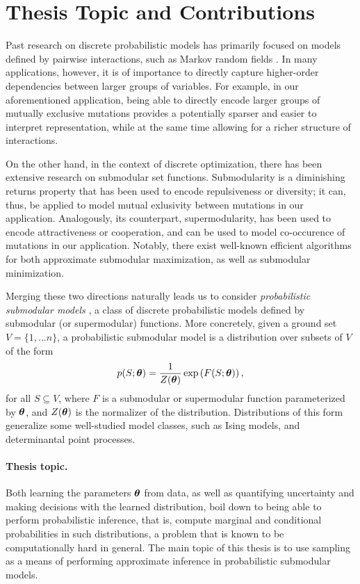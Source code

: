 \section{Thesis Topic and Contributions}
Past research on discrete probabilistic models has primarily focused on models defined by pairwise interactions, such as Markov random fields \cite{koller09}.
In many applications, however, it is of importance to directly capture higher-order dependencies between larger groups of variables.
For example, in our aforementioned application, being able to directly encode larger groups of mutually exclusive mutations provides a potentially sparser and easier to interpret representation, while at the same time allowing for a richer structure of interactions.

On the other hand, in the context of discrete optimization, there has been extensive research on submodular set functions.
Submodularity is a diminishing returns property that has been used to encode repulsiveness or diversity; it can, thus, be applied to model mutual exlusivity between mutations in our application.
Analogously, its counterpart, supermodularity, has been used to encode attractiveness or cooperation, and can be used to model co-occurence of mutations in our application.
Notably, there exist well-known efficient algorithms for both approximate submodular maximization, as well as submodular minimization.

Merging these two directions naturally leads us to consider \emph{probabilistic submodular models} \citep{djolonga14,gotovos15}, a class of discrete probabilistic models defined by submodular (or supermodular) functions.
More concretely, given a ground set $V = \{1,\ldots n\}$, a probabilistic submodular model is a distribution over subsets of $V$ of the form
\begin{align*}
p(S; \bm{\theta}) = \frac{1}{Z(\bm{\theta})} \exp\left( F(S; \bm{\theta}) \right),
\end{align*}
for all $S \subseteq V$, where $F$ is a submodular or supermodular function parameterized by $\bm{\theta}$, and $Z(\bm{\theta})$ is the normalizer of the distribution.
Distributions of this form generalize some well-studied model classes, such as Ising models, and determinantal point processes.

\paragraph{Thesis topic.} Both learning the parameters $\bm{\theta}$ from data, as well as quantifying uncertainty and making decisions with the learned distribution, boil down to being able to perform probabilistic inference, that is, compute marginal and conditional probabilities in such distributions, a problem that is known to be computationally hard in general.
The main topic of this thesis is to use sampling as a means of performing approximate inference in probabilistic submodular models.


